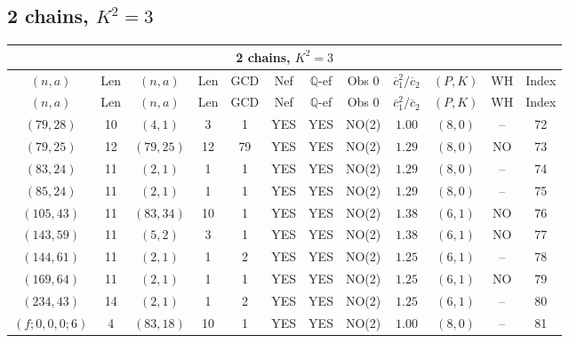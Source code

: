 \subsection{2 chains, $K^2 = 3$}
\begin{longtable}{|c|c|c|c|c|c|c|c|c|c|c|c|}
\hline
\multicolumn{12}{|c|}{2 chains, $K^2 = 3$}\\
\hline
$(n,a)$ & Len & $(n,a)$ & Len & GCD & Nef & $\mathbb Q$-ef & Obs 0 & $\overline c_1^2 / \overline c_2$ & $(P,K)$ & WH & Index\\
\hline
\endfirsthead

\hline
$(n,a)$ & Len & $(n,a)$ & Len & GCD & Nef & $\mathbb Q$-ef & Obs 0 & $\overline c_1^2 / \overline c_2$ & $(P,K)$ & WH & Index\\
\hline
\endhead
\hline
\endfoot

$(79,28)$ & 10 & $(4,1)$ & 3 & 1 & YES & YES & NO(2) & $1.00$ & $(8,0)$ & -- & 72\\
$(79,25)$ & 12 & $(79,25)$ & 12 & 79 & YES & YES & NO(2) & $1.29$ & $(8,0)$ & NO & 73\\
$(83,24)$ & 11 & $(2,1)$ & 1 & 1 & YES & YES & NO(2) & $1.29$ & $(8,0)$ & -- & 74\\
$(85,24)$ & 11 & $(2,1)$ & 1 & 1 & YES & YES & NO(2) & $1.29$ & $(8,0)$ & -- & 75\\
$(105,43)$ & 11 & $(83,34)$ & 10 & 1 & YES & YES & NO(2) & $1.38$ & $(6,1)$ & NO & 76\\
$(143,59)$ & 11 & $(5,2)$ & 3 & 1 & YES & YES & NO(2) & $1.38$ & $(6,1)$ & NO & 77\\
$(144,61)$ & 11 & $(2,1)$ & 1 & 2 & YES & YES & NO(2) & $1.25$ & $(6,1)$ & -- & 78\\
$(169,64)$ & 11 & $(2,1)$ & 1 & 1 & YES & YES & NO(2) & $1.25$ & $(6,1)$ & NO & 79\\
$(234,43)$ & 14 & $(2,1)$ & 1 & 2 & YES & YES & NO(2) & $1.25$ & $(6,1)$ & -- & 80\\
$(f;0,0,0;6)$ & 4 & $(83,18)$ & 10 & 1 & YES & YES & NO(2) & $1.00$ & $(8,0)$ & -- & 81
\end{longtable}
